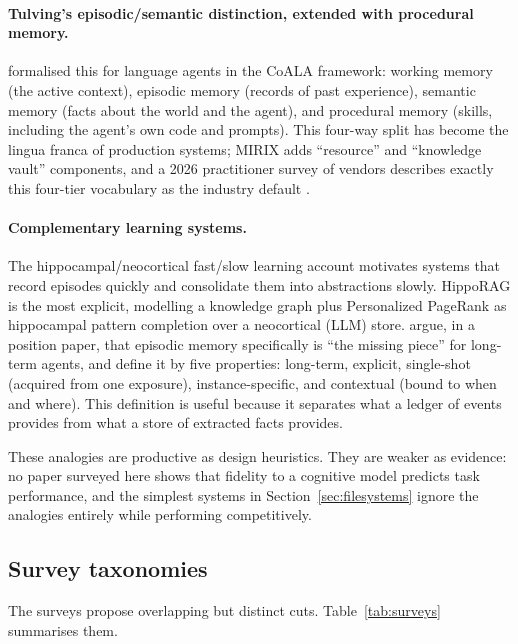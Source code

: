 \documentclass[11pt]{article}
\begin{document}
\paragraph{Tulving's episodic/semantic distinction, extended with procedural memory.} \citet{sumers2023coala} formalised this for language agents in the CoALA framework: working memory (the active context), episodic memory (records of past experience), semantic memory (facts about the world and the agent), and procedural memory (skills, including the agent's own code and prompts). This four-way split has become the lingua franca of production systems; MIRIX \citep{wang2025mirix} adds ``resource'' and ``knowledge vault'' components, and a 2026 practitioner survey of vendors describes exactly this four-tier vocabulary as the industry default \citep{kumar2026agentmemory}.

\paragraph{Complementary learning systems.} The hippocampal/neocortical fast/slow learning account motivates systems that record episodes quickly and consolidate them into abstractions slowly. HippoRAG \citep{gutierrez2024hipporag} is the most explicit, modelling a knowledge graph plus Personalized PageRank as hippocampal pattern completion over a neocortical (LLM) store. \citet{pink2025episodic} argue, in a position paper, that episodic memory specifically is ``the missing piece'' for long-term agents, and define it by five properties: long-term, explicit, single-shot (acquired from one exposure), instance-specific, and contextual (bound to when and where). This definition is useful because it separates what a ledger of events provides from what a store of extracted facts provides.

These analogies are productive as design heuristics. They are weaker as evidence: no paper surveyed here shows that fidelity to a cognitive model predicts task performance, and the simplest systems in Section~\ref{sec:filesystems} ignore the analogies entirely while performing competitively.

\subsection{Survey taxonomies}

The surveys propose overlapping but distinct cuts. Table~\ref{tab:surveys} summarises them.
\end{document}
